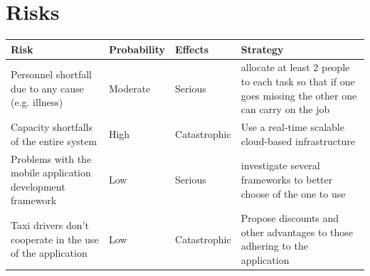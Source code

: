 \documentclass{article}
\begin{document}
\section{Risks}
\begin{table}[H]
	\begin{adjustbox}{width = 1.2\textwidth}
	\begin{tabular}{*{4}{p{}}}
		\toprule
		Risk & Probability & Effects & Strategy\\
		\midrule
		Personnel shortfall due to any cause (e.g. illness) & Moderate & Serious & allocate at least 2 people to each task so that if one goes missing the other one can carry on the job\\
		Capacity shortfalls of the entire system & High & Catastrophic & Use a real-time scalable cloud-based infrastructure  \\
		Problems with the mobile application development framework & Low & Serious & investigate several frameworks to better choose of the one to use\\
		Taxi drivers don't cooperate in the use of the application & Low & Catastrophic & Propose discounts and other advantages to those adhering to the application\\		
		\bottomrule
	\end{tabular}
	\end{adjustbox}
\end{table}
\end{document}
